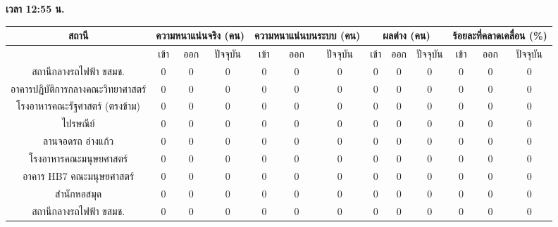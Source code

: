     \textbf{เวลา 12:55 น.}
    {\tiny\begin{center}
        \begin{tabular}{ | c | c | c | c | c | c | c | c | c | c | c | c | c |  }
            \hline
                \multirow{2}{*}{สถานี} & \multicolumn{3}{|c|}{ความหนาแน่นจริง (คน)} & \multicolumn{3}{|c|}{ความหนาแน่นบนระบบ (คน)} & \multicolumn{3}{|c|}{ผลต่าง (คน)} & \multicolumn{3}{|c|}{ร้อยละที่คลาดเคลื่อน (\%)} \\
            \hline
                & เข้า & ออก & ปัจจุบัน & เข้า & ออก & ปัจจุบัน & เข้า & ออก & ปัจจุบัน & เข้า & ออก & ปัจจุบัน \\
            \hline
                สถานีกลางรถไฟฟ้า ขสมช.            & 0 & 0 & 0 & 0 & 0 & 0 & 0 & 0 & 0 & 0 & 0 & 0 \\
                อาคารปฏิบัติการกลางคณะวิทยาศาสตร์    & 0 & 0 & 0 & 0 & 0 & 0 & 0 & 0 & 0 & 0 & 0 & 0 \\
                โรงอาหารคณะรัฐศาสตร์ (ตรงข้าม)      & 0 & 0 & 0 & 0 & 0 & 0 & 0 & 0 & 0 & 0 & 0 & 0 \\
                ไปรษณีย์                          & 0 & 0 & 0 & 0 & 0 & 0 & 0 & 0 & 0 & 0 & 0 & 0 \\
                ลานจอดรถ อ่างแก้ว                  & 0 & 0 & 0 & 0 & 0 & 0 & 0 & 0 & 0 & 0 & 0 & 0 \\
                โรงอาหารคณะมนุษยศาสตร์            & 0 & 0 & 0 & 0 & 0 & 0 & 0 & 0 & 0 & 0 & 0 & 0 \\
                อาคาร HB7 คณะมนุษยศาสตร์          & 0 & 0 & 0 & 0 & 0 & 0 & 0 & 0 & 0 & 0 & 0 & 0 \\
                สำนักหอสมุด                       & 0 & 0 & 0 & 0 & 0 & 0 & 0 & 0 & 0 & 0 & 0 & 0 \\
                สถานีกลางรถไฟฟ้า ขสมช.            & 0 & 0 & 0 & 0 & 0 & 0 & 0 & 0 & 0 & 0 & 0 & 0 \\
            \hline
        \end{tabular}
    \end{center}}

